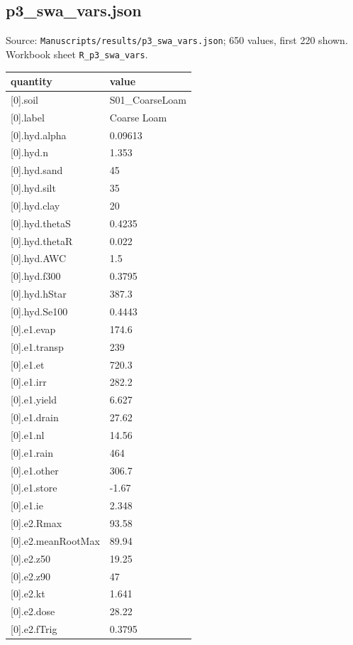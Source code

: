 \subsection*{p3\_swa\_vars.json}
\noindent\small Source: \nolinkurl{Manuscripts/results/p3_swa_vars.json}; 650 values, first 220 shown. Workbook sheet \texttt{R\_p3\_swa\_vars}.\par
{\scriptsize\begin{longtable}{p{}p{}}\toprule\textbf{quantity} & \textbf{value}\\\midrule\endhead
{}[0].soil & S01\_CoarseLoam\\
{}[0].label & Coarse Loam\\
{}[0].hyd.alpha & 0.09613\\
{}[0].hyd.n & 1.353\\
{}[0].hyd.sand & 45\\
{}[0].hyd.silt & 35\\
{}[0].hyd.clay & 20\\
{}[0].hyd.thetaS & 0.4235\\
{}[0].hyd.thetaR & 0.022\\
{}[0].hyd.AWC & 1.5\\
{}[0].hyd.f300 & 0.3795\\
{}[0].hyd.hStar & 387.3\\
{}[0].hyd.Se100 & 0.4443\\
{}[0].e1.evap & 174.6\\
{}[0].e1.transp & 239\\
{}[0].e1.et & 720.3\\
{}[0].e1.irr & 282.2\\
{}[0].e1.yield & 6.627\\
{}[0].e1.drain & 27.62\\
{}[0].e1.nl & 14.56\\
{}[0].e1.rain & 464\\
{}[0].e1.other & 306.7\\
{}[0].e1.store & -1.67\\
{}[0].e1.ie & 2.348\\
{}[0].e2.Rmax & 93.58\\
{}[0].e2.meanRootMax & 89.94\\
{}[0].e2.z50 & 19.25\\
{}[0].e2.z90 & 47\\
{}[0].e2.kt & 1.641\\
{}[0].e2.dose & 28.22\\
{}[0].e2.fTrig & 0.3795\\

\end{longtable}}
